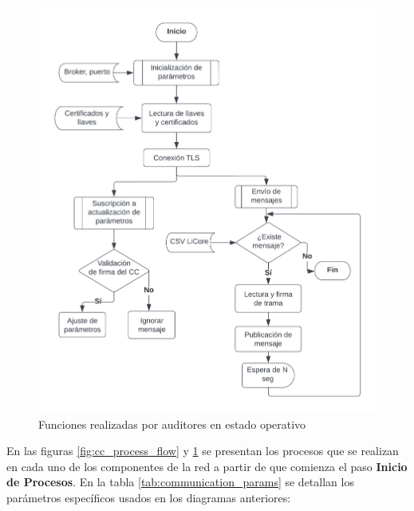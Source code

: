\documentclass{article}
\begin{document}
\begin{figure}[!htbp]
\begin{minipage}{0.4\textwidth}
                    \includegraphics[scale=0.55]{proceso_auditor.png}
                    \caption{Funciones realizadas por auditores en estado operativo}
                    \label{fig:auditor_process_flow}
                \end{minipage}
            \end{figure}

            En las figuras \ref{fig:cc_process_flow} y \ref{fig:auditor_process_flow} se presentan los procesos que se realizan en cada uno de los componentes de la red a partir de que comienza el paso \textbf{Inicio de Procesos}. En la tabla \ref{tab:communication_params} se detallan los parámetros específicos usados en los diagramas anteriores:
            \begin{table}[!htbp]
                \centering
                \caption{Parámetros de comunicación}
                \label{tab:communication_params}
            \end{table}
\end{document}
